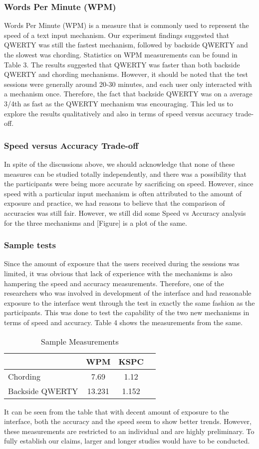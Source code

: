 \subsubsection{Words Per Minute (WPM)}
Words Per Minute (WPM) is a measure that is commonly used to represent the speed of a text input mechanism. Our experiment findings suggested that QWERTY was still the fastest mechanism, followed by backside QWERTY and the slowest was chording. Statistics on WPM measurements can be found in Table 3.
The results suggested that QWERTY was faster than both backside QWERTY and chording mechanisms. However, it should be noted that the test sessions were generally around 20-30 minutes, and each user only interacted with a mechanism once. Therefore, the fact that backside QWERTY was on a average 3/4th as fast as the QWERTY mechanism was encouraging. This led us to explore the results qualitatively and also in terms of speed versus accuracy trade-off.
\subsubsection{Speed versus Accuracy Trade-off}
In spite of the discussions above, we should acknowledge that none of these measures can be studied totally independently, and there was a possibility that the participants were being more accurate by sacrificing on speed. However, since speed with a particular input mechanism is often attributed to the amount of exposure and practice, we had reasons to believe that the comparison of accuracies was still fair. However, we still did some Speed vs Accuracy analysis for the three mechanisms and [Figure] is a plot of the same.
\subsubsection{Sample tests}
Since the amount of exposure that the users received during the sessions was limited, it was obvious that lack of experience with the mechanisms is also hampering the speed and accuracy measurements. Therefore, one of the researchers who was involved in development of the interface and had reasonable exposure to the interface went through the test in exactly the same fashion as the participants. This was done to test the capability of the two new mechanisms in terms of speed and accuracy. Table 4 shows the measurements from the same.
\begin{table*}
	\centering
		\begin{tabular}{|l|c|c|c|} \hline
		                         & WPM & KSPC \\ \hline
			 Chording & 7.69 & 1.12 \\ \hline
			 Backside QWERTY & 13.231 & 1.152 \\ \hline
		\end{tabular}
	\caption{Sample Measurements}
	\label{tab:StatisticsForTextCorpora}
\end{table*}
It can be seen from the table that with decent amount of exposure to the interface, both the accuracy and the speed seem to show better trends. However, these measurements are restricted to an individual and are highly preliminary. To fully establish our claims, larger and longer studies would have to be conducted.
